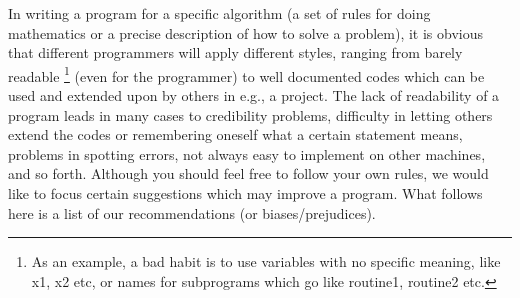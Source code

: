 In writing a program for a specific algorithm (a set of rules
for doing mathematics or a precise description of how to solve a problem), 
it is obvious that different programmers
will apply different styles, ranging from barely 
readable
%
\footnote{As an example, a bad habit is to use variables
 with no specific meaning, like x1, x2 etc,
or names for subprograms which go like routine1, routine2 etc.} 
%
(even for the 
programmer) to well documented codes which can be used and extended
upon by others in e.g., a project. 
The lack of readability of a program leads in many cases to credibility
problems, difficulty in letting others extend the codes or remembering
oneself what a certain statement means, problems
in spotting errors, not always easy to implement on other machines,
 and so
forth. Although you should feel free to follow your own rules, we would like
to focus certain
suggestions which may improve a program. What follows here
is a list of our recommendations (or biases/prejudices).

